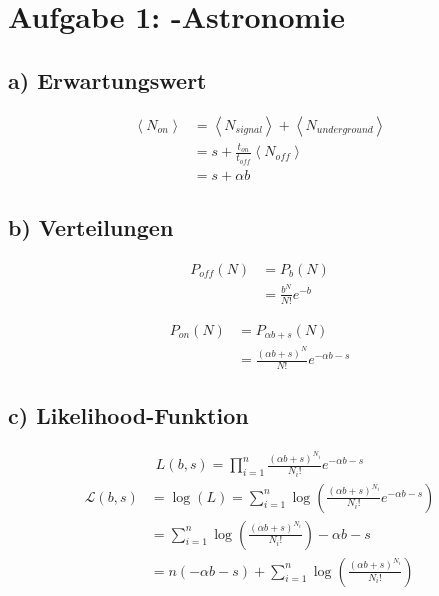 \section*{Aufgabe 1: \gamma-Astronomie}
\label{sec:Aufgabe1}
\subsection*{a) Erwartungswert}
\label{sub:Erwartungswert}
\begin{align}
    \left<N_{on}\right> &=\left<N_{signal}\right>+\left<N_{underground}\right>\nonumber\\
                        &=s + \frac{t_{on}}{t_{off}} \left<N_{off}\right>\nonumber\\
                        &=s+\alpha b
\end{align}

\subsection*{b) Verteilungen}
\label{sub:Verteilungen}
\begin{align}
    P_{off}(N)&=P_{b}(N)\nonumber\\
              &=\frac{b^N}{N!}e^{-b}
\end{align}

\begin{align}
    P_{on}(N)&=P_{\alpha b+s}(N)\nonumber\\
                       &=\frac{(\alpha b+s)^N}{N!}e^{-\alpha b-s}
\end{align}

\subsection*{c) Likelihood-Funktion}
\label{sub:Likelihood-Funktion}
\begin{align}
    L(b,s)=\prod_{i=1}^n \frac{(\alpha b+s)^{N_i}}{{N_i}!}e^{-\alpha b-s}
\end{align}
\begin{align}
    \mathcal{L}(b,s)&=\log(L)=\sum_{i=1}^n \log\left(\frac{(\alpha b+s)^{N_i}}{{N_i}!}e^{-\alpha b-s}\right)\nonumber\\
                    &=\sum_{i=1}^n \log\left(\frac{(\alpha b+s)^{N_i}}{{N_i}!}\right)-\alpha b-s\nonumber\\
                    &=n (-\alpha b-s)+ \sum_{i=1}^n \log\left(\frac{(\alpha b+s)^{N_i}}{{N_i}!}\right)
\end{align}